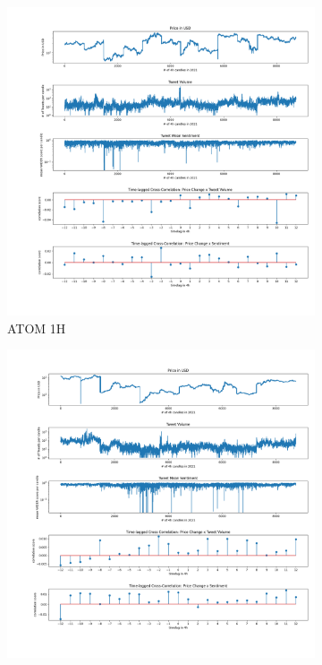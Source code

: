 \documentclass[11pt]{article}
\begin{document}
\begin{figure}[H]
     \centering
     \begin{subfigure}[b]{0.45\textwidth}
         \centering
         \includegraphics[width=\textwidth]{figures/crosscorrATOM_1h_range(-12, 13).png}
         \caption{ATOM 1H}
         \label{atom1h}
     \end{subfigure}
     \hfill 
     \begin{subfigure}[b]{0.45\textwidth}
         \centering
         \includegraphics[width=\textwidth]{figures/crosscorrAVAX_1h_range(-12, 13).png}

\end{subfigure}
\end{figure}
\end{document}
